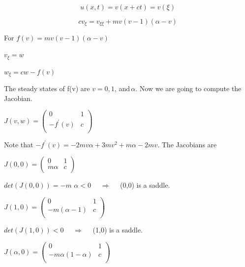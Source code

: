 \documentclass[]{article}
\numberwithin{equation}{section}		%
\begin{document}
\begin{equation}
u(x,t)=v(x+ct)=v(\xi) \nonumber
\end{equation}

\begin{equation}
cv_\xi =v_{\xi\xi} + m v(v-1)(\alpha-v) \nonumber
\end{equation}

\noindent For $f(v)=m v(v-1)(\alpha-v)$

\begin{center}
$v_{\xi}=w$

$w_{\xi}=cw-f(v)$\\
\end{center}

\noindent The steady states of f(v) are $v=0,1,$\,and\,$\alpha$. Now we are going to compute the Jacobian.


\begin{center}
$J(v,w)=
\begin{pmatrix}
  0 & 1 \\
  -f^{'}(v) & c \\
\end{pmatrix}$
\par\end{center}

Note that $-f^{'}(v)=-2mv\alpha+3mv^{2}+m\alpha-2mv$.
\newline\indent The Jacobians are

\begin{center}
$J(0,0)=
\begin{pmatrix}
  0 & 1 \\
  m\alpha & c \\
\end{pmatrix}$
\par\end{center}

$det(J(0,0))=-m$ $\alpha < 0$ \ \ $ \Rightarrow$ \ \ (0,0) is a saddle.

\begin{center}
$J(1,0)=
\begin{pmatrix}
  0 & 1 \\
  -m(\alpha-1) & c \\
\end{pmatrix}$
\par\end{center}

$det(J(1,0)) < 0$ \ \ $ \Rightarrow$ \ \ (1,0) is a saddle.


\begin{center}
$J(\alpha,0)=
\begin{pmatrix}
  0 & 1 \\
  -m\alpha(1-\alpha) & c \\
\end{pmatrix}$
\par\end{center}
\end{document}
